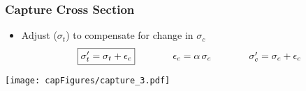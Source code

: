 \begin{frame}
\frametitle{Capture Cross Section}	
\begin{itemize} 
	\item Adjust  ($\sigma_t$) to compensate for change in $\sigma_c$
	\begin{equation*}
	\begin{array}{ccc}
	\boxed{\sigma'_t = \sigma_t + \epsilon_c}\hspace{0.4in} &  \epsilon_c = \alpha\,\sigma_c &\hspace{0.4in} \sigma'_c = \sigma_c + \epsilon_c%
	\end{array}
	\end{equation*}
	\end{itemize}
	\pause
\begin{minipage}{0.49\textwidth}
\begin{table}[t!] 
	\vspace{-0.63870in} \pause
  \begin{center}
  \end{center}
\end{table}
\end{minipage}
\begin{minipage}{0.49\textwidth}
\texttt{[image: capFigures/capture\_3.pdf]}
\end{minipage}	

\end{frame} 

